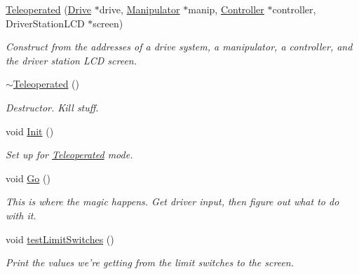 \begin{DoxyCompactItemize}
\item 
\hyperlink{class_r_j_f_r_c2011_1_1_teleoperated_a4faee78835700892307b89c9977f523e}{Teleoperated} (\hyperlink{class_r_j_f_r_c2011_1_1_drive}{Drive} $\ast$drive, \hyperlink{class_r_j_f_r_c2011_1_1_manipulator}{Manipulator} $\ast$manip, \hyperlink{class_r_j_f_r_c2011_1_1_controller}{Controller} $\ast$controller, DriverStationLCD $\ast$screen)
\begin{DoxyCompactList}\small\item\em Construct from the addresses of a drive system, a manipulator, a controller, and the driver station LCD screen. \item\end{DoxyCompactList}\item 
\hypertarget{class_r_j_f_r_c2011_1_1_teleoperated_a19603fc214137c80b292de4ccf5fd3ec}{
\hyperlink{class_r_j_f_r_c2011_1_1_teleoperated_a19603fc214137c80b292de4ccf5fd3ec}{$\sim$Teleoperated} ()}
\label{class_r_j_f_r_c2011_1_1_teleoperated_a19603fc214137c80b292de4ccf5fd3ec}

\begin{DoxyCompactList}\small\item\em Destructor. Kill stuff. \item\end{DoxyCompactList}\item 
\hypertarget{class_r_j_f_r_c2011_1_1_teleoperated_a12d319115a887d3308c5f0a74d0df10f}{
void \hyperlink{class_r_j_f_r_c2011_1_1_teleoperated_a12d319115a887d3308c5f0a74d0df10f}{Init} ()}
\label{class_r_j_f_r_c2011_1_1_teleoperated_a12d319115a887d3308c5f0a74d0df10f}

\begin{DoxyCompactList}\small\item\em Set up for \hyperlink{class_r_j_f_r_c2011_1_1_teleoperated}{Teleoperated} mode. \item\end{DoxyCompactList}\item 
void \hyperlink{class_r_j_f_r_c2011_1_1_teleoperated_a22fa5b99fdf48c16e4f86db0bb0f4c02}{Go} ()
\begin{DoxyCompactList}\small\item\em This is where the magic happens. Get driver input, then figure out what to do with it. \item\end{DoxyCompactList}\item 
\hypertarget{class_r_j_f_r_c2011_1_1_teleoperated_a885303324836622da915a1204ac5e9bf}{
void \hyperlink{class_r_j_f_r_c2011_1_1_teleoperated_a885303324836622da915a1204ac5e9bf}{testLimitSwitches} ()}
\label{class_r_j_f_r_c2011_1_1_teleoperated_a885303324836622da915a1204ac5e9bf}

\begin{DoxyCompactList}\small\item\em Print the values we're getting from the limit switches to the screen. \item\end{DoxyCompactList}\end{DoxyCompactItemize}
